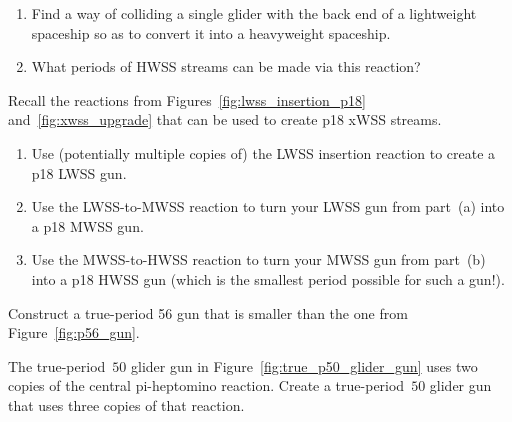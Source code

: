 \begin{multicols}{2}
\begin{problem}
		\begin{enumerate}[label=\bf\color{ocre}(\alph*)]
			\item Find a way of colliding a single glider with the back end of a lightweight spaceship so as to convert it into a heavyweight spaceship.
			
			\item What periods of HWSS streams can be made via this reaction?
		\end{enumerate}
	\end{problem}


	\mfilbreak
	
	
	\begin{problem}\label{exer:pseudo_xwss_gun_p18} 
		Recall the reactions from Figures~\ref{fig:lwss_insertion_p18} and~\ref{fig:xwss_upgrade} that can be used to create p18 xWSS streams.\smallskip
		
		\begin{enumerate}[label=\bf\color{ocre}(\alph*)]
			\item Use (potentially multiple copies of) the LWSS insertion reaction to create a p18 LWSS gun.
			
			\item Use the LWSS-to-MWSS reaction to turn your LWSS gun from part~(a) into a p18 MWSS gun.
			
			\item Use the MWSS-to-HWSS reaction to turn your MWSS gun from part~(b) into a p18 HWSS gun (which is the smallest period possible for such a gun!).
		\end{enumerate}
	\end{problem}


	\mfilbreak
	
	
	\begin{problem}\label{exer:p56_gun_smaller} 
		Construct a true-period 56 gun that is smaller than the one from Figure~\ref{fig:p56_gun}.
		
	\end{problem}
	
	
	\mfilbreak
	
	
	\begin{problem}\label{exer:p50_triple_gun}
		The true-period~$50$ glider gun in Figure~\ref{fig:true_p50_glider_gun} uses two copies of the central pi-heptomino reaction. Create a true-period~$50$ glider gun that uses three copies of that reaction.
	\end{problem}
	

\end{multicols}
